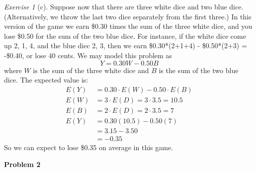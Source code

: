\documentclass[12pt]{amsart}
\theoremstyle{remark}
\newtheorem*{exercise}{Exercise}%
\theoremstyle{mycomment}
\begin{document}
\begin{exercise}[c]
Suppose now that there are three white dice and two blue dice. (Alternatively, we throw the last two
dice separately from the first three.) In this version of the game we earn \$0.30 times the sum of the three
white dice, and you lose \$0.50 for the sum of the two blue dice. For instance, if the white dice come up 2,
1, 4, and the blue diec 2, 3, then we earn \$0.30*(2+1+4) - \$0.50*(2+3) = -\$0.40, or lose 40 cents. We may model this problem as
$$Y = 0.30W - 0.50B$$
where $W$ is the sum of the three white dice and $B$ is the sum of the two blue dice. The expected value is:
\begin{align*}
E(Y) &= 0.30 \cdot E(W) - 0.50 \cdot E(B) \\
E(W) &= 3 \cdot E(D) = 3 \cdot 3.5 = 10.5 \\
E(B) &= 2 \cdot E(D) = 2 \cdot 3.5 = 7 \\
E(Y) &= 0.30(10.5) - 0.50(7) \\
     &= 3.15 - 3.50 \\
     &= -0.35
\end{align*}
So we can expect to lose \$0.35 on average in this game.
\end{exercise}
\begin{center}
	\textbf{Problem 2}
\end{center}
\end{document}
